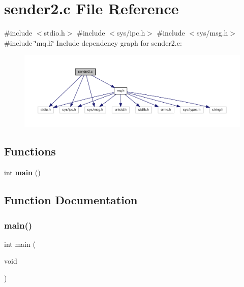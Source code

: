 \section{sender2.\+c File Reference}
\label{sender2_8c}
{\ttfamily \#include $<$stdio.\+h$>$}\newline
{\ttfamily \#include $<$sys/ipc.\+h$>$}\newline
{\ttfamily \#include $<$sys/msg.\+h$>$}\newline
{\ttfamily \#include \char`\"{}mq.\+h\char`\"{}}\newline
Include dependency graph for sender2.\+c\+:\nopagebreak
\begin{figure}[H]
\begin{center}
\leavevmode
\includegraphics[width=350pt]{sender2_8c__incl}
\end{center}
\end{figure}
\subsection*{Functions}
\begin{DoxyCompactItemize}
\item 
int \textbf{ main} ()
\end{DoxyCompactItemize}


\subsection{Function Documentation}
\mbox{\label{sender2_8c_ae66f6b31b5ad750f1fe042a706a4e3d4}} 
\subsubsection{main()}
{\footnotesize\ttfamily int main (\begin{DoxyParamCaption}\item[{void}]{ }\end{DoxyParamCaption})}

